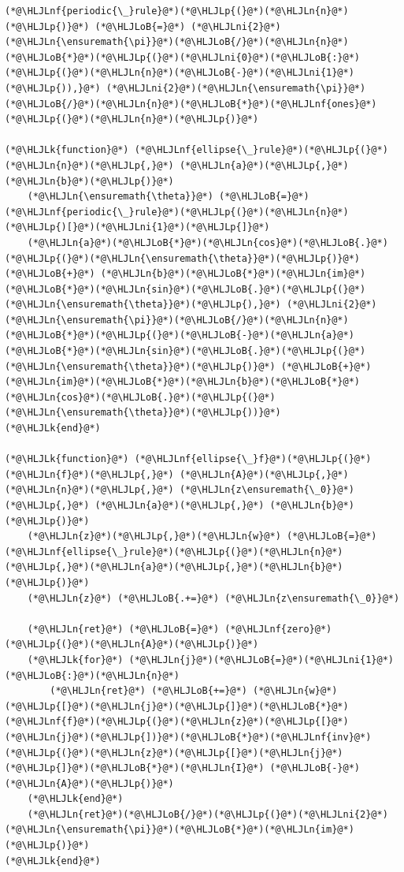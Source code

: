 \documentclass[12pt,a4paper]{article}
\newcommand{\HLJLk}[1]{\textcolor[RGB]{148,91,176}{\textbf{#1}}}
\newcommand{\HLJLn}[1]{#1}
\newcommand{\HLJLnf}[1]{\textcolor[RGB]{66,102,213}{#1}}
\newcommand{\HLJLni}[1]{\textcolor[RGB]{59,151,46}{#1}}
\newcommand{\HLJLoB}[1]{\textcolor[RGB]{102,102,102}{\textbf{#1}}}
\newcommand{\HLJLp}[1]{#1}
\begin{document}
\begin{lstlisting}
(*@\HLJLnf{periodic{\_}rule}@*)(*@\HLJLp{(}@*)(*@\HLJLn{n}@*)(*@\HLJLp{)}@*) (*@\HLJLoB{=}@*) (*@\HLJLni{2}@*)(*@\HLJLn{\ensuremath{\pi}}@*)(*@\HLJLoB{/}@*)(*@\HLJLn{n}@*)(*@\HLJLoB{*}@*)(*@\HLJLp{(}@*)(*@\HLJLni{0}@*)(*@\HLJLoB{:}@*)(*@\HLJLp{(}@*)(*@\HLJLn{n}@*)(*@\HLJLoB{-}@*)(*@\HLJLni{1}@*)(*@\HLJLp{)),}@*) (*@\HLJLni{2}@*)(*@\HLJLn{\ensuremath{\pi}}@*)(*@\HLJLoB{/}@*)(*@\HLJLn{n}@*)(*@\HLJLoB{*}@*)(*@\HLJLnf{ones}@*)(*@\HLJLp{(}@*)(*@\HLJLn{n}@*)(*@\HLJLp{)}@*)

(*@\HLJLk{function}@*) (*@\HLJLnf{ellipse{\_}rule}@*)(*@\HLJLp{(}@*)(*@\HLJLn{n}@*)(*@\HLJLp{,}@*) (*@\HLJLn{a}@*)(*@\HLJLp{,}@*) (*@\HLJLn{b}@*)(*@\HLJLp{)}@*) 
    (*@\HLJLn{\ensuremath{\theta}}@*) (*@\HLJLoB{=}@*) (*@\HLJLnf{periodic{\_}rule}@*)(*@\HLJLp{(}@*)(*@\HLJLn{n}@*)(*@\HLJLp{)[}@*)(*@\HLJLni{1}@*)(*@\HLJLp{]}@*)
    (*@\HLJLn{a}@*)(*@\HLJLoB{*}@*)(*@\HLJLn{cos}@*)(*@\HLJLoB{.}@*)(*@\HLJLp{(}@*)(*@\HLJLn{\ensuremath{\theta}}@*)(*@\HLJLp{)}@*) (*@\HLJLoB{+}@*) (*@\HLJLn{b}@*)(*@\HLJLoB{*}@*)(*@\HLJLn{im}@*)(*@\HLJLoB{*}@*)(*@\HLJLn{sin}@*)(*@\HLJLoB{.}@*)(*@\HLJLp{(}@*)(*@\HLJLn{\ensuremath{\theta}}@*)(*@\HLJLp{),}@*) (*@\HLJLni{2}@*)(*@\HLJLn{\ensuremath{\pi}}@*)(*@\HLJLoB{/}@*)(*@\HLJLn{n}@*)(*@\HLJLoB{*}@*)(*@\HLJLp{(}@*)(*@\HLJLoB{-}@*)(*@\HLJLn{a}@*)(*@\HLJLoB{*}@*)(*@\HLJLn{sin}@*)(*@\HLJLoB{.}@*)(*@\HLJLp{(}@*)(*@\HLJLn{\ensuremath{\theta}}@*)(*@\HLJLp{)}@*) (*@\HLJLoB{+}@*) (*@\HLJLn{im}@*)(*@\HLJLoB{*}@*)(*@\HLJLn{b}@*)(*@\HLJLoB{*}@*)(*@\HLJLn{cos}@*)(*@\HLJLoB{.}@*)(*@\HLJLp{(}@*)(*@\HLJLn{\ensuremath{\theta}}@*)(*@\HLJLp{))}@*)
(*@\HLJLk{end}@*)

(*@\HLJLk{function}@*) (*@\HLJLnf{ellipse{\_}f}@*)(*@\HLJLp{(}@*)(*@\HLJLn{f}@*)(*@\HLJLp{,}@*) (*@\HLJLn{A}@*)(*@\HLJLp{,}@*) (*@\HLJLn{n}@*)(*@\HLJLp{,}@*) (*@\HLJLn{z\ensuremath{\_0}}@*)(*@\HLJLp{,}@*) (*@\HLJLn{a}@*)(*@\HLJLp{,}@*) (*@\HLJLn{b}@*)(*@\HLJLp{)}@*)
    (*@\HLJLn{z}@*)(*@\HLJLp{,}@*)(*@\HLJLn{w}@*) (*@\HLJLoB{=}@*) (*@\HLJLnf{ellipse{\_}rule}@*)(*@\HLJLp{(}@*)(*@\HLJLn{n}@*)(*@\HLJLp{,}@*)(*@\HLJLn{a}@*)(*@\HLJLp{,}@*)(*@\HLJLn{b}@*)(*@\HLJLp{)}@*)
    (*@\HLJLn{z}@*) (*@\HLJLoB{.+=}@*) (*@\HLJLn{z\ensuremath{\_0}}@*)

    (*@\HLJLn{ret}@*) (*@\HLJLoB{=}@*) (*@\HLJLnf{zero}@*)(*@\HLJLp{(}@*)(*@\HLJLn{A}@*)(*@\HLJLp{)}@*)
    (*@\HLJLk{for}@*) (*@\HLJLn{j}@*)(*@\HLJLoB{=}@*)(*@\HLJLni{1}@*)(*@\HLJLoB{:}@*)(*@\HLJLn{n}@*)
        (*@\HLJLn{ret}@*) (*@\HLJLoB{+=}@*) (*@\HLJLn{w}@*)(*@\HLJLp{[}@*)(*@\HLJLn{j}@*)(*@\HLJLp{]}@*)(*@\HLJLoB{*}@*)(*@\HLJLnf{f}@*)(*@\HLJLp{(}@*)(*@\HLJLn{z}@*)(*@\HLJLp{[}@*)(*@\HLJLn{j}@*)(*@\HLJLp{])}@*)(*@\HLJLoB{*}@*)(*@\HLJLnf{inv}@*)(*@\HLJLp{(}@*)(*@\HLJLn{z}@*)(*@\HLJLp{[}@*)(*@\HLJLn{j}@*)(*@\HLJLp{]}@*)(*@\HLJLoB{*}@*)(*@\HLJLn{I}@*) (*@\HLJLoB{-}@*) (*@\HLJLn{A}@*)(*@\HLJLp{)}@*)
    (*@\HLJLk{end}@*)
    (*@\HLJLn{ret}@*)(*@\HLJLoB{/}@*)(*@\HLJLp{(}@*)(*@\HLJLni{2}@*)(*@\HLJLn{\ensuremath{\pi}}@*)(*@\HLJLoB{*}@*)(*@\HLJLn{im}@*)(*@\HLJLp{)}@*)
(*@\HLJLk{end}@*)


\end{lstlisting}
\end{document}
